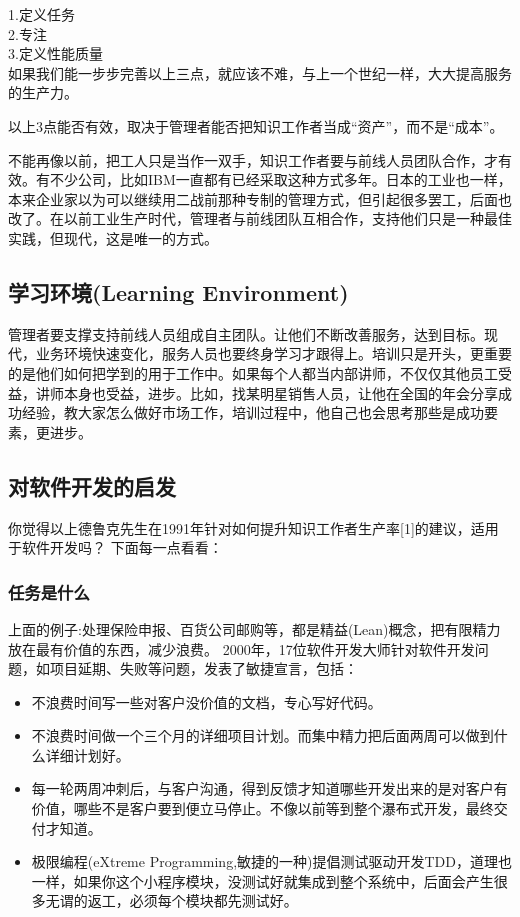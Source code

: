 1.定义任务\\
2.专注\\
3.定义性能质量\\
如果我们能一步步完善以上三点，就应该不难，与上一个世纪一样，大大提高服务的生产力。

以上3点能否有效，取决于管理者能否把知识工作者当成``资产''，而不是``成本''。

不能再像以前，把工人只是当作一双手，知识工作者要与前线人员团队合作，才有效。有不少公司，比如IBM一直都有已经采取这种方式多年。日本的工业也一样，本来企业家以为可以继续用二战前那种专制的管理方式，但引起很多罢工，后面也改了。在以前工业生产时代，管理者与前线团队互相合作，支持他们只是一种最佳实践，但现代，这是唯一的方式。

\hypertarget{ux5b66ux4e60ux73afux5883learning-environment}{%
\subsection{学习环境(Learning
Environment)}\label{ux5b66ux4e60ux73afux5883learning-environment}}

管理者要支撑支持前线人员组成自主团队。让他们不断改善服务，达到目标。现代，业务环境快速变化，服务人员也要终身学习才跟得上。培训只是开头，更重要的是他们如何把学到的用于工作中。如果每个人都当内部讲师，不仅仅其他员工受益，讲师本身也受益，进步。比如，找某明星销售人员，让他在全国的年会分享成功经验，教大家怎么做好市场工作，培训过程中，他自己也会思考那些是成功要素，更进步。

\hypertarget{ux5bf9ux8f6fux4ef6ux5f00ux53d1ux7684ux542fux53d1}{%
\subsection{对软件开发的启发}\label{ux5bf9ux8f6fux4ef6ux5f00ux53d1ux7684ux542fux53d1}}

你觉得以上德鲁克先生在1991年针对如何提升知识工作者生产率{[}1{]}的建议，适用于软件开发吗？
下面每一点看看：

\hypertarget{ux4efbux52a1ux662fux4ec0ux4e48}{%
\subsubsection{任务是什么}\label{ux4efbux52a1ux662fux4ec0ux4e48}}

上面的例子:处理保险申报、百货公司邮购等，都是精益(Lean)概念，把有限精力放在最有价值的东西，减少浪费。
2000年，17位软件开发大师针对软件开发问题，如项目延期、失败等问题，发表了敏捷宣言，包括：

\begin{itemize}
\tightlist
\item
  不浪费时间写一些对客户没价值的文档，专心写好代码。
\item
  不浪费时间做一个三个月的详细项目计划。而集中精力把后面两周可以做到什么详细计划好。
\item
  每一轮两周冲刺后，与客户沟通，得到反馈才知道哪些开发出来的是对客户有价值，哪些不是客户要到便立马停止。不像以前等到整个瀑布式开发，最终交付才知道。
\item
  极限编程(eXtreme
  Programming,敏捷的一种)提倡测试驱动开发TDD，道理也一样，如果你这个小程序模块，没测试好就集成到整个系统中，后面会产生很多无谓的返工，必须每个模块都先测试好。
\end{itemize}

